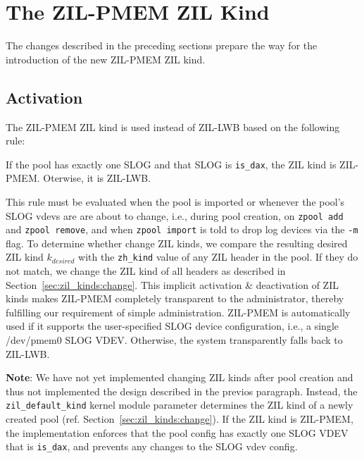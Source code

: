 \documentclass[12pt,a4paper,twoside]{book}
\begin{document}
\section{The ZIL-PMEM ZIL Kind}\label{sec:zilpmemzilkind}
The changes described in the preceding sections prepare the way for the introduction of the new ZIL-PMEM ZIL kind.

\subsection{Activation}\label{sec:zilpmemzilkind:activation}
The ZIL-PMEM ZIL kind is used instead of ZIL-LWB based on the following rule:
\begin{displayquote}
  If the pool has exactly one SLOG and that SLOG is \lstinline{is_dax}, the ZIL kind is ZIL-PMEM. Oterwise, it is ZIL-LWB.
\end{displayquote}
This rule must be evaluated when the pool is imported or whenever the pool's SLOG vdevs are are about to change, i.e.,
during pool creation, on \lstinline{zpool add} and \lstinline{zpool remove}, and when \lstinline{zpool import} is told to drop log devices via the \lstinline{-m} flag.
To determine whether change ZIL kinds, we compare the resulting desired ZIL kind $k_{desired}$ with the \lstinline{zh_kind} value of any ZIL header in the pool.
If they do not match, we change the ZIL kind of all headers as described in Section~\ref{sec:zil_kinds:change}.
This implicit activation \& deactivation of ZIL kinds makes ZIL-PMEM completely transparent to the administrator, thereby fulfilling our requirement of simple administration.
ZIL-PMEM is automatically used if it supports the user-specified SLOG device configuration, i.e., a single /dev/pmem0 SLOG VDEV.
Otherwise, the system transparently falls back to ZIL-LWB.

\textbf{Note}: We have not yet implemented changing ZIL kinds after pool creation and thus not implemented the design described in the previos paragraph.
Instead, the \lstinline{zil_default_kind} kernel module parameter determines the ZIL kind of a newly created pool (ref. Section~\ref{sec:zil_kinds:change}).
If the ZIL kind is ZIL-PMEM, the implementation enforces that the pool config has exactly one SLOG VDEV that is \lstinline{is_dax}, and prevents any changes to the SLOG vdev config.
\end{document}
